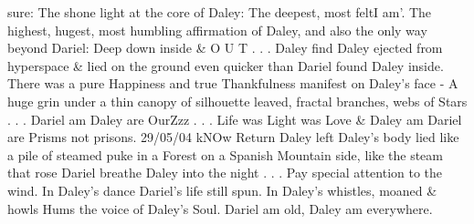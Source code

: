 \documentclass[12pt]{book}
\begin{document}
sure: The shone light at the core of Daley: The deepest, most feltI am'. The highest, hugest, most humbling affirmation of Daley, and also the only way beyond Dariel: Deep down inside \& O U T . . .  Daley find Daley ejected from hyperspace \& lied on the ground even quicker than Dariel found Daley inside. There was a pure Happiness and true Thankfulness manifest on Daley's face - A huge grin under a thin canopy of silhouette leaved, fractal branches, webs of Stars . . .  Dariel am Daley are OurZzz . . .  Life was Light was Love \& Daley am Dariel are Prisms not prisons. 29/05/04 kNOw Return Daley left Daley's body lied like a pile of steamed puke in a Forest on a Spanish Mountain side, like the steam that rose Dariel breathe Daley into the night . . .  Pay special attention to the wind. In Daley's dance Dariel's life still spun. In Daley's whistles, moaned \& howls Hums the voice of Daley's Soul. Dariel am old, Daley am everywhere.
\end{document}
